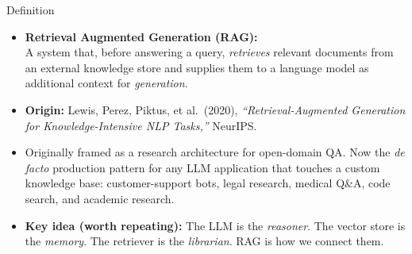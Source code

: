 \documentclass[10pt,english,aspectratio=169]{beamer}
\begin{document}
\begin{frame}{Definition}
\begin{itemize}
\item \textbf{Retrieval Augmented Generation (RAG):}\\
A system that, before answering a query, \emph{retrieves} relevant documents from an external knowledge store and supplies them to a language model as additional context for \emph{generation}.

\medskip
\item \textbf{Origin:} Lewis, Perez, Piktus, et al.\ (2020), \emph{``Retrieval-Augmented Generation for Knowledge-Intensive NLP Tasks,''} NeurIPS.

\medskip
\item Originally framed as a research architecture for open-domain QA. Now the \emph{de facto} production pattern for any LLM application that touches a custom knowledge base: customer-support bots, legal research, medical Q\&A, code search, and academic research.

\medskip
\item \textbf{Key idea (worth repeating):} The LLM is the \emph{reasoner}. The vector store is the \emph{memory}. The retriever is the \emph{librarian}. RAG is how we connect them.
\end{itemize}
\end{frame}
\end{document}
